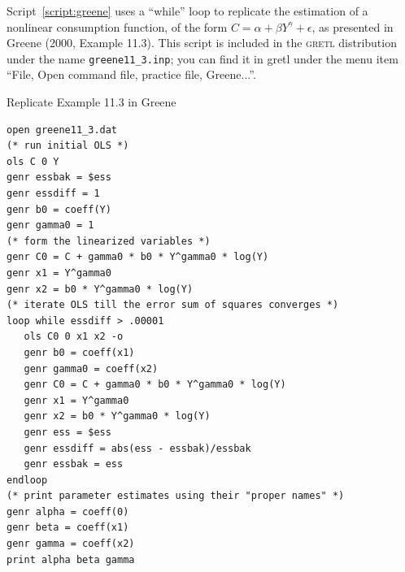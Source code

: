 \documentclass{article}
\begin{document}
Script~\ref{script:greene} uses a ``while'' loop to replicate the
estimation of a nonlinear consumption function, of the form $C =
\alpha + \beta Y^{\gamma} + \epsilon$, as presented in Greene (2000,
Example 11.3).  This script is included in the \textsc{gretl}
distribution under the name \texttt{greene11\_3.inp}; you can find it
in \textsf{gretl} under the menu item ``File, Open command file,
practice file, Greene...''.

\begin{script}[htbp]
\caption{Replicate Example 11.3 in Greene}
\label{script:greene}
\begin{verbatim}
open greene11_3.dat
(* run initial OLS *)
ols C 0 Y
genr essbak = $ess
genr essdiff = 1
genr b0 = coeff(Y)
genr gamma0 = 1
(* form the linearized variables *)
genr C0 = C + gamma0 * b0 * Y^gamma0 * log(Y)
genr x1 = Y^gamma0
genr x2 = b0 * Y^gamma0 * log(Y)
(* iterate OLS till the error sum of squares converges *)
loop while essdiff > .00001
   ols C0 0 x1 x2 -o
   genr b0 = coeff(x1)
   genr gamma0 = coeff(x2)
   genr C0 = C + gamma0 * b0 * Y^gamma0 * log(Y)
   genr x1 = Y^gamma0
   genr x2 = b0 * Y^gamma0 * log(Y)
   genr ess = $ess
   genr essdiff = abs(ess - essbak)/essbak
   genr essbak = ess
endloop 
(* print parameter estimates using their "proper names" *)
genr alpha = coeff(0)
genr beta = coeff(x1)
genr gamma = coeff(x2) 
print alpha beta gamma 
\end{verbatim}
\end{script}


\clearpage
\end{document}
